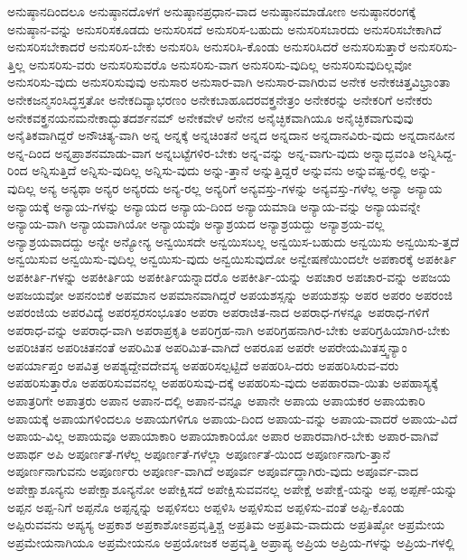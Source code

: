 {ಅನುಷ್ಠಾನದಿಂದಲೂ
ಅನುಷ್ಠಾನದೊಳಗೆ
ಅನುಷ್ಠಾನಪ್ರಧಾನ-ವಾದ
ಅನುಷ್ಠಾನಮಾಡೋಣ
ಅನುಷ್ಠಾನರಂಗಕ್ಕೆ
ಅನುಷ್ಠಾನ-ವನ್ನು
ಅನುಸರಿಸಕೂಡದು
ಅನುಸರಿಸದೆ
ಅನುಸರಿಸ-ಬಹುದು
ಅನುಸರಿಸಬಾರದು
ಅನುಸರಿಸಬೇಕಾಗಿದೆ
ಅನುಸರಿಸಬೇಕಾದರೆ
ಅನುಸರಿಸ-ಬೇಕು
ಅನುಸರಿಸಿ
ಅನುಸರಿಸಿ-ಕೊಂಡು
ಅನುಸರಿಸಿದರೆ
ಅನುಸರಿಸುತ್ತಾರೆ
ಅನುಸರಿಸು-ತ್ತಿಲ್ಲ
ಅನುಸರಿಸು-ವರು
ಅನುಸರಿಸುವರೊ
ಅನುಸರಿಸು-ವಾಗ
ಅನುಸರಿಸು-ವುದಿಲ್ಲ
ಅನುಸರಿಸುವುದಿಲ್ಲವೋ
ಅನುಸರಿಸು-ವುದು
ಅನುಸರಿಸುವುವು
ಅನುಸಾರ
ಅನುಸಾರ-ವಾಗಿ
ಅನುಸಾರ-ವಾಗಿರುವ
ಅನೇಕ
ಅನೇಕಚಿತ್ತವಿಭ್ರಾಂತಾ
ಅನೇಕಜನ್ಮಸಂಸಿದ್ಧಸ್ತತೋ
ಅನೇಕದಿವ್ಯಾಭರಣಂ
ಅನೇಕಬಾಹೂದರವಕ್ತ್ರನೇತ್ರಂ
ಅನೇಕರನ್ನು
ಅನೇಕರಿಗೆ
ಅನೇಕರು
ಅನೇಕವಕ್ತ್ರನಯನಮನೇಕಾದ್ಭುತದರ್ಶನಮ್
ಅನೇಕವೇಳೆ
ಅನೇನ
ಅನೈಚ್ಛಿಕವಾಗಿಯೂ
ಅನೈಚ್ಛಿಕವಾಗುವುವು
ಅನೈತಿಕವಾಗಿದ್ದರೆ
ಅನೌಚಿತ್ಯ-ವಾಗಿ
ಅನ್ನ
ಅನ್ನಕ್ಕೆ
ಅನ್ನಚಿಂತನೆ
ಅನ್ನದ
ಅನ್ನದಾನ
ಅನ್ನದಾನವಿರು-ವುದು
ಅನ್ನದಾನಹೀನ
ಅನ್ನ-ದಿಂದ
ಅನ್ನಪ್ರಾಶನಮಾಡು-ವಾಗ
ಅನ್ನಬಟ್ಟೆಗಳಿರ-ಬೇಕು
ಅನ್ನ-ವನ್ನು
ಅನ್ನ-ವಾಗು-ವುದು
ಅನ್ನಾದ್ಭವಂತಿ
ಅನ್ನಿಸಿದ್ದ-ರಿಂದ
ಅನ್ನಿಸುತ್ತಿದೆ
ಅನ್ನಿಸು-ವುದಿಲ್ಲ
ಅನ್ನಿಸು-ವುದು
ಅನ್ನು-ತ್ತಾನೆ
ಅನ್ನುತ್ತಿದ್ದರೆ
ಅನ್ನುವನು
ಅನ್ನುವಷ್ಟ-ರಲ್ಲಿ
ಅನ್ನು-ವುದಿಲ್ಲ
ಅನ್ಯ
ಅನ್ಯಥಾ
ಅನ್ಯರ
ಅನ್ಯರದು
ಅನ್ಯ-ರಲ್ಲ
ಅನ್ಯರಿಗೆ
ಅನ್ಯವಸ್ತು-ಗಳನ್ನು
ಅನ್ಯವಸ್ತು-ಗಳೆಲ್ಲ
ಅನ್ಯಾ
ಅನ್ಯಾಯ
ಅನ್ಯಾಯಕ್ಕೆ
ಅನ್ಯಾಯ-ಗಳನ್ನು
ಅನ್ಯಾಯದ
ಅನ್ಯಾಯ-ದಿಂದ
ಅನ್ಯಾಯಮಾಡಿ
ಅನ್ಯಾಯ-ವನ್ನು
ಅನ್ಯಾಯವನ್ನೇ
ಅನ್ಯಾಯ-ವಾಗಿ
ಅನ್ಯಾಯವಾಗಿಯೋ
ಅನ್ಯಾಯವೊ
ಅನ್ಯಾಶ್ರಯದ
ಅನ್ಯಾಶ್ರಯದ್ದು
ಅನ್ಯಾಶ್ರಯ-ವಲ್ಲ
ಅನ್ಯಾಶ್ರಯವಾದದ್ದು
ಅನ್ಯೇ
ಅನ್ಯೋನ್ಯ
ಅನ್ವಯಿಸದೇ
ಅನ್ವಯಿಸಬಲ್ಲ
ಅನ್ವಯಿಸ-ಬಹುದು
ಅನ್ವಯಿಸು
ಅನ್ವಯಿಸು-ತ್ತದೆ
ಅನ್ವಯಿಸುವ
ಅನ್ವಯಿಸು-ವುದಿಲ್ಲ
ಅನ್ವಯಿಸು-ವುದು
ಅನ್ವಯಿಸುವುದೋ
ಅನ್ವೇಷಣೆಯಿಂದಲೇ
ಅಪಕಾರಕ್ಕೆ
ಅಪಕೀರ್ತಿ
ಅಪಕೀರ್ತಿ-ಗಳನ್ನು
ಅಪಕೀರ್ತಿಯ
ಅಪಕೀರ್ತಿಯನ್ನಾದರೊ
ಅಪಕೀರ್ತಿ-ಯನ್ನು
ಅಪಚಾರ
ಅಪಚಾರ-ವನ್ನು
ಅಪಜಯ
ಅಪಜಯವೋ
ಅಪನಂಬಿಕೆ
ಅಪಮಾನ
ಅಪಮಾನವಾಗಿದ್ದರೆ
ಅಪಯಶಸ್ಸನ್ನು
ಅಪಯಶಸ್ಸು
ಅಪರ
ಅಪರಂ
ಅಪರಂಜಿ
ಅಪರಂಜಿಯ
ಅಪರವಿದ್ಯೆ
ಅಪರಸ್ಪರಸಂಭೂತಂ
ಅಪರಾ
ಅಪರಾಜಿತ-ನಾದ
ಅಪರಾಧ-ಗಳನ್ನೂ
ಅಪರಾಧ-ಗಳಿಗೆ
ಅಪರಾಧ-ವನ್ನು
ಅಪರಾಧ-ವಾಗಿ
ಅಪರಾಪ್ರಕೃತಿ
ಅಪರಿಗ್ರಹ-ನಾಗಿ
ಅಪರಿಗ್ರಹನಾಗಿರ-ಬೇಕು
ಅಪರಿಗ್ರಹಿಯಾಗಿರ-ಬೇಕು
ಅಪರಿಚಿತನ
ಅಪರಿಚಿತನಂತೆ
ಅಪರಿಮಿತ
ಅಪರಿಮಿತ-ವಾಗಿದೆ
ಅಪರೂಪ
ಅಪರೇ
ಅಪರೇಯಮಿತಸ್ತ್ವನ್ಯಾಂ
ಅಪರ್ಯಾಪ್ತಂ
ಅಪವಿತ್ರ
ಅಪಶ್ಯದ್ದೇವದೇವಸ್ಯ
ಅಪಹರಿಸಲ್ಪಟ್ಟಿದೆ
ಅಪಹರಿಸಿ-ದರು
ಅಪಹರಿಸಿರುವ-ವರು
ಅಪಹರಿಸುತ್ತಾರೊ
ಅಪಹರಿಸುವವನಲ್ಲ
ಅಪಹರಿಸುವು-ದಕ್ಕೆ
ಅಪಹರಿಸು-ವುದು
ಅಪಹಾರವಾ-ಯಿತು
ಅಪಹಾಸ್ಯಕ್ಕೆ
ಅಪಾತ್ರರಿಗೇ
ಅಪಾತ್ರರು
ಅಪಾನ
ಅಪಾನ-ದಲ್ಲಿ
ಅಪಾನ-ವನ್ನೂ
ಅಪಾನೇ
ಅಪಾಯ
ಅಪಾಯಕರ
ಅಪಾಯಕಾರಿ
ಅಪಾಯಕ್ಕೆ
ಅಪಾಯಗಳಿಂದಲೂ
ಅಪಾಯಗಳಿಗೂ
ಅಪಾಯ-ದಿಂದ
ಅಪಾಯ-ವನ್ನು
ಅಪಾಯ-ವಾದರೆ
ಅಪಾಯ-ವಿದೆ
ಅಪಾಯ-ವಿಲ್ಲ
ಅಪಾಯವೂ
ಅಪಾಯಾಕಾರಿ
ಅಪಾಯಾಕಾರಿಯೋ
ಅಪಾರ
ಅಪಾರವಾಗಿರ-ಬೇಕು
ಅಪಾರ-ವಾಗಿವೆ
ಅಪಾರ್ಥ
ಅಪಿ
ಅಪೂರ್ಣತೆ-ಗಳೆಲ್ಲ
ಅಪೂರ್ಣತೆ-ಗಳೆಲ್ಲಾ
ಅಪೂರ್ಣತೆ-ಯಿಂದ
ಅಪೂರ್ಣನಾಗು-ತ್ತಾನೆ
ಅಪೂರ್ಣನಾಗುವನು
ಅಪೂರ್ಣರು
ಅಪೂರ್ಣ-ವಾಗಿದೆ
ಅಪೂರ್ವ
ಅಪೂರ್ವದ್ದಾಗಿರು-ವುದು
ಅಪೂರ್ವ-ವಾದ
ಅಪೇಕ್ಷಾಶೂನ್ಯನು
ಅಪೇಕ್ಷಾಶೂನ್ಯನೋ
ಅಪೇಕ್ಷಿಸದೆ
ಅಪೇಕ್ಷಿಸುವವನಲ್ಲ
ಅಪೇಕ್ಷೆ
ಅಪೇಕ್ಷೆ-ಯನ್ನು
ಅಪ್ಪ
ಅಪ್ಪಣೆ-ಯನ್ನು
ಅಪ್ಪನ
ಅಪ್ಪ-ನಿಗೆ
ಅಪ್ಪನೊ
ಅಪ್ಪನ್ನನ್ನು
ಅಪ್ಪಳಿಸಲು
ಅಪ್ಪಳಿಸಿ
ಅಪ್ಪಳಿಸುವ
ಅಪ್ಪಳಿಸು-ವಂತೆ
ಅಪ್ಪಿ-ಕೊಂಡು
ಅಪ್ಪಿರುವವನು
ಅಪ್ಯಸ್ಯ
ಅಪ್ರಕಾಶ
ಅಪ್ರಕಾಶೋಽಪ್ರವೃತ್ತಿಶ್ಚ
ಅಪ್ರತಿಮ
ಅಪ್ರತಿಮ-ವಾದುದು
ಅಪ್ರತಿಷ್ಠೋ
ಅಪ್ರಮೇಯ
ಅಪ್ರಮೇಯನಾಗಿಯೂ
ಅಪ್ರಮೇಯನೂ
ಅಪ್ರಯೋಜಕ
ಅಪ್ರವೃತ್ತಿ
ಅಪ್ರಾಪ್ಯ
ಅಪ್ರಿಯ
ಅಪ್ರಿಯ-ಗಳನ್ನು
ಅಪ್ರಿಯ-ಗಳಲ್ಲಿ
}
